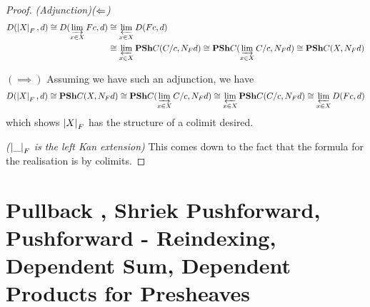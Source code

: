 \documentclass{article}
\begin{document}
\begin{prop}
\end{prop}
\begin{proof}
  
  \textit{(Adjunction)($\Leftarrow$)}
  \begin{align*}
    D(\left\vert X \right\vert_F , d) \cong D(\varinjlim_{x \in X} F c , d)
    &\cong \varprojlim_{x \in X} D(F c , d) \\
    &\cong \varprojlim_{x \in X} \mathbf{PSh} C ( C / c , N_F d)
    \cong \mathbf{PSh} C (\varinjlim_{x \in X} C / c , N_F d)
    \cong \mathbf{PSh} C (X , N_F d)
  \end{align*}

  $(\implies)$ Assuming we have such an adjunction,
  we have 
  \begin{align*}
    D(\left\vert X \right\vert_F , d) \cong \mathbf{PSh} C (X , N_F d)
    \cong \mathbf{PSh} C (\varinjlim_{x \in X} C / c , N_F d)
    \cong \varprojlim_{x \in X} \mathbf{PSh} C ( C / c , N_F d)
    \cong \varprojlim_{x \in X} D(F c , d)
  \end{align*}
  which shows $\left\vert X \right\vert_F$ has the structure of
  a colimit desired.

  \textit{($\left\vert \_ \right\vert_F$ is the left Kan extension)}
  This comes down to the fact that
  the formula for the realisation is by colimits.

\end{proof}

\section{Pullback , Shriek Pushforward, Pushforward - 
  Reindexing, Dependent Sum, Dependent Products for Presheaves}
\end{document}
